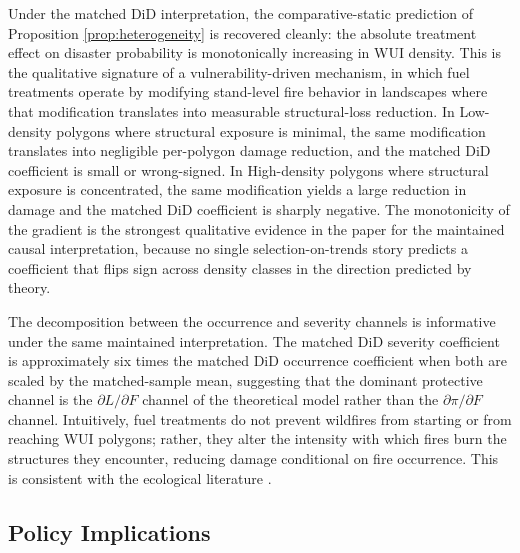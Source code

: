 \documentclass[12pt, letterpaper]{article}
\begin{document}
Under the matched DiD interpretation, the comparative-static prediction of Proposition \ref{prop:heterogeneity} is recovered cleanly: the absolute treatment effect on disaster probability is monotonically increasing in WUI density. This is the qualitative signature of a vulnerability-driven mechanism, in which fuel treatments operate by modifying stand-level fire behavior in landscapes where that modification translates into measurable structural-loss reduction. In Low-density polygons where structural exposure is minimal, the same modification translates into negligible per-polygon damage reduction, and the matched DiD coefficient is small or wrong-signed. In High-density polygons where structural exposure is concentrated, the same modification yields a large reduction in damage and the matched DiD coefficient is sharply negative. The monotonicity of the gradient is the strongest qualitative evidence in the paper for the maintained causal interpretation, because no single selection-on-trends story predicts a coefficient that flips sign across density classes in the direction predicted by theory.

The decomposition between the occurrence and severity channels is informative under the same maintained interpretation. The matched DiD severity coefficient is approximately six times the matched DiD occurrence coefficient when both are scaled by the matched-sample mean, suggesting that the dominant protective channel is the $\partial L / \partial F$ channel of the theoretical model rather than the $\partial \pi / \partial F$ channel. Intuitively, fuel treatments do not prevent wildfires from starting or from reaching WUI polygons; rather, they alter the intensity with which fires burn the structures they encounter, reducing damage conditional on fire occurrence. This is consistent with the ecological literature \citep{stephens2012, agee2005}.

\subsection{Policy Implications}
\end{document}
